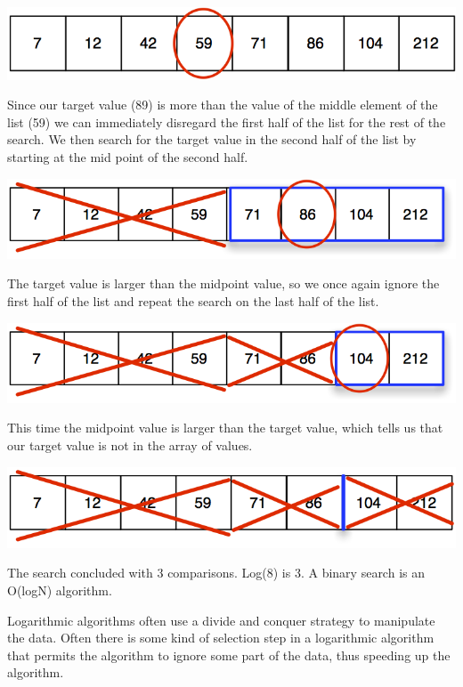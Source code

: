 \includegraphics{pictures/binarySearch1.png}

Since our target value (89) is more than the value of the middle element of the list (59) we can immediately disregard the first half of the list  for the rest of the search.   We then search for the target value in the second half of the list by starting at the mid point of the second half.

\includegraphics{pictures/binarySearch2.png}


The target value is larger than the midpoint value, so we once again ignore the first half of the list and repeat the search on the last half of the list.

\includegraphics{pictures/binarySearch3.png}

This time the  midpoint value is larger than the target value, which tells us that our target value is not in the array of values.


\includegraphics{pictures/binarySearch4.png}

The search concluded with 3 comparisons.   Log(8)  is 3.  A binary search is an O(logN) algorithm.


Logarithmic algorithms often use a divide and conquer strategy to manipulate the data.   Often there is some kind of selection step in a logarithmic algorithm that permits the algorithm to ignore some part of the data, thus speeding up the algorithm.


